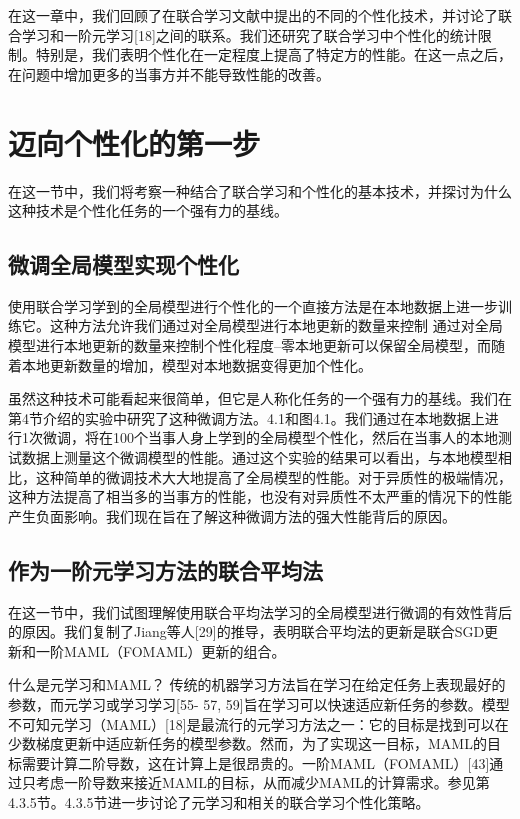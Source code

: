 在这一章中，我们回顾了在联合学习文献中提出的不同的个性化技术，并讨论了联合学习和一阶元学习[18]之间的联系。我们还研究了联合学习中个性化的统计限制。特别是，我们表明个性化在一定程度上提高了特定方的性能。在这一点之后，在问题中增加更多的当事方并不能导致性能的改善。

\section{迈向个性化的第一步}
在这一节中，我们将考察一种结合了联合学习和个性化的基本技术，并探讨为什么这种技术是个性化任务的一个强有力的基线。

\subsection{微调全局模型实现个性化}
使用联合学习学到的全局模型进行个性化的一个直接方法是在本地数据上进一步训练它。这种方法允许我们通过对全局模型进行本地更新的数量来控制 通过对全局模型进行本地更新的数量来控制个性化程度--零本地更新可以保留全局模型，而随着本地更新数量的增加，模型对本地数据变得更加个性化。

虽然这种技术可能看起来很简单，但它是人称化任务的一个强有力的基线。我们在第4节介绍的实验中研究了这种微调方法。4.1和图4.1。我们通过在本地数据上进行1次微调，将在100个当事人身上学到的全局模型个性化，然后在当事人的本地测试数据上测量这个微调模型的性能。通过这个实验的结果可以看出，与本地模型相比，这种简单的微调技术大大地提高了全局模型的性能。对于异质性的极端情况，这种方法提高了相当多的当事方的性能，也没有对异质性不太严重的情况下的性能产生负面影响。我们现在旨在了解这种微调方法的强大性能背后的原因。

\subsection{作为一阶元学习方法的联合平均法}
在这一节中，我们试图理解使用联合平均法学习的全局模型进行微调的有效性背后的原因。我们复制了Jiang等人[29]的推导，表明联合平均法的更新是联合SGD更新和一阶MAML（FOMAML）更新的组合。

什么是元学习和MAML？
传统的机器学习方法旨在学习在给定任务上表现最好的参数，而元学习或学习学习[55- 57, 59]旨在学习可以快速适应新任务的参数。模型不可知元学习（MAML）[18]是最流行的元学习方法之一：它的目标是找到可以在少数梯度更新中适应新任务的模型参数。然而，为了实现这一目标，MAML的目标需要计算二阶导数，这在计算上是很昂贵的。一阶MAML（FOMAML）[43]通过只考虑一阶导数来接近MAML的目标，从而减少MAML的计算需求。参见第4.3.5节。4.3.5节进一步讨论了元学习和相关的联合学习个性化策略。

